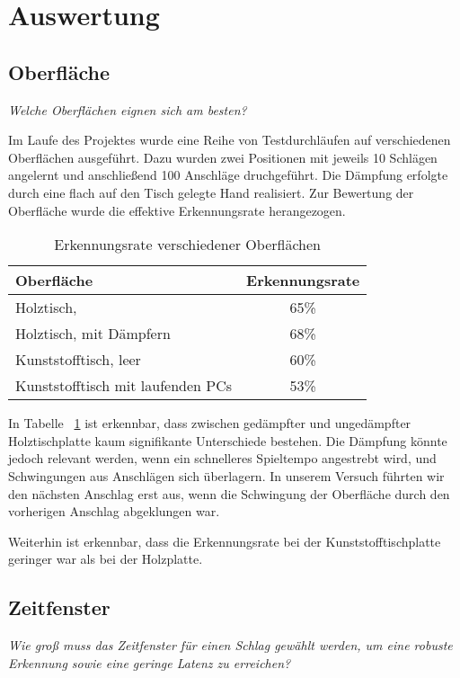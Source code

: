 \section{Auswertung}
\subsection{Oberfläche}
\textit{Welche Oberflächen eignen sich am besten?}

Im Laufe des Projektes wurde eine Reihe von Testdurchläufen auf verschiedenen Oberflächen ausgeführt. Dazu wurden zwei Positionen mit jeweils 10 Schlägen angelernt und anschließend 100 Anschläge druchgeführt. 
Die Dämpfung erfolgte durch eine flach auf den Tisch gelegte Hand realisiert. 
Zur Bewertung der Oberfläche wurde die effektive Erkennungsrate herangezogen.

\begin{table}[H]   
	\centering
     
     \caption{Erkennungsrate verschiedener Oberflächen}
     \label{tab:surf}
\begin{tabular}{l c}
Oberfläche & Erkennungsrate \\
\hline
Holztisch, & 65\% \\
Holztisch, mit Dämpfern & 68\% \\
Kunststofftisch, leer & 60\% \\
Kunststofftisch mit laufenden PCs & 53\% \\

\end{tabular}
\end{table}



In Tabelle ~\ref{tab:surf} ist erkennbar, dass zwischen gedämpfter und ungedämpfter Holztischplatte kaum signifikante Unterschiede bestehen. 
Die Dämpfung könnte jedoch relevant werden, wenn ein schnelleres Spieltempo angestrebt wird, und Schwingungen aus Anschlägen sich überlagern. 
In unserem Versuch führten wir den nächsten Anschlag erst aus, wenn die Schwingung der Oberfläche durch den vorherigen Anschlag abgeklungen war.

Weiterhin ist erkennbar, dass die Erkennungsrate bei der Kunststofftischplatte geringer war als bei der Holzplatte.


\subsection{Zeitfenster}
\textit{Wie groß muss das Zeitfenster für einen Schlag gewählt werden, um eine robuste Erkennung sowie eine geringe Latenz zu erreichen?}

